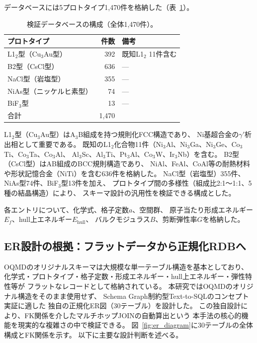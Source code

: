 \documentclass[5p,twocolumn]{elsarticle}
\begin{document}
データベースには5プロトタイプ1{,}470件を格納した（表~\ref{tab:db_composition}）。

\begin{table}[htbp]
  \centering
  \caption{検証データベースの構成（全体1{,}470件）。}
  \label{tab:db_composition}
  \small
  \begin{tabular}{lrl}
    \toprule
    プロトタイプ & 件数 & 備考 \\
    \midrule
    L1$_2$型（Cu$_3$Au型） & 392 & 既知L1$_2$ 11件含む \\
    B2型（CsCl型） & 636 & --- \\
    NaCl型（岩塩型） & 355 & --- \\
    NiAs型（ニッケルヒ素型） & 74 & --- \\
    BiF$_3$型 & 13 & --- \\
    \midrule
    合計 & 1{,}470 & \\
    \bottomrule
  \end{tabular}
\end{table}

L1$_2$型（Cu$_3$Au型）はA$_3$B組成を持つ規則化FCC構造であり、
Ni基超合金の$\gamma'$析出相として重要である。
既知のL1$_2$化合物11件（Ni$_3$Al、Ni$_3$Ga、Ni$_3$Ge、Co$_3$Ti、Co$_3$Ta、Co$_3$Al、
Al$_3$Sc、Al$_3$Ti、Pt$_3$Al、Co$_3$W、Ir$_3$Nb）を含む。
B2型（CsCl型）はAB組成のBCC規則構造であり、
NiAl、FeAl、CoAl等の耐熱材料や形状記憶合金（NiTi）を含む636件を格納した。
NaCl型（岩塩型）355件、NiAs型74件、BiF$_3$型13件を加え、
プロトタイプ間の多様性（組成比2:1～1:1、5種の結晶構造）により、
スキーマ設計の汎用性を検証できる構成とした。

各エントリについて、化学式、格子定数$a$、空間群、
原子当たり形成エネルギー$E_f$、hull上エネルギー$E_\text{hull}$、
バルクモジュラス$B$、剪断弾性率$G$を格納した。

\subsection{ER設計の根拠：フラットデータから正規化RDBへ}
\label{sec:er_design}

OQMDのオリジナルスキーマは大規模な単一テーブル構造を基本としており、
化学式・プロトタイプ・格子定数・形成エネルギー・hull上エネルギー・弾性特性等が
フラットなレコードとして格納されている。
本研究ではOQMDのオリジナル構造をそのまま使用せず、
Schema Graph制約型Text-to-SQLのコンセプト実証に適した
独自の正規化ER図（30テーブル）を設計した。
この独自設計により、FK関係を介したマルチホップJOINの自動算出という
本手法の核心的機能を現実的な複雑さの中で検証できる。
図~\ref{fig:er_diagram}に30テーブルの全体構成とFK関係を示す。
以下に主要な設計判断を述べる。
\end{document}
